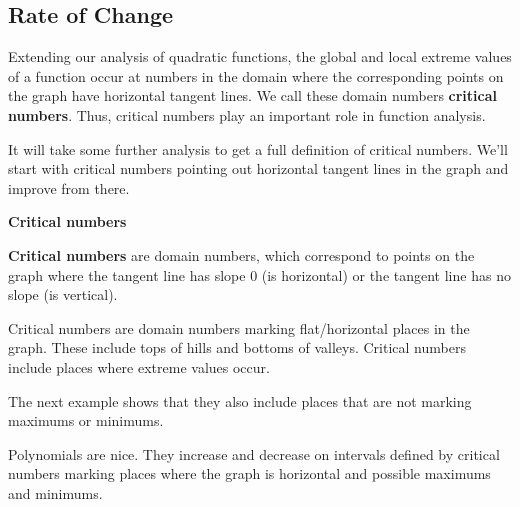\documentclass{ximera}
\begin{document}
\subsection*{Rate of Change}


Extending our analysis of quadratic functions, the global and local extreme values of a function occur at numbers in the domain where the corresponding points on the graph have horizontal tangent lines. We call these domain numbers \textbf{critical numbers}.  Thus, critical numbers play an important role in function analysis.  


It will take some further analysis to get a full definition of critical numbers. We'll start with critical numbers pointing out horizontal tangent lines in the graph and improve from there.









\begin{definition} \item \textbf{\textcolor{green!50!black}{Critical numbers}}

\textbf{Critical numbers} are domain numbers, which correspond to points on the graph where the tangent line has slope $0$ (is horizontal) or the tangent line has no slope (is vertical).

\end{definition}




Critical numbers are domain numbers marking flat/horizontal places in the graph.  These include tops of hills and bottoms of valleys. Critical numbers include places where extreme values occur.


The next example shows that they also include places that are not marking maximums or minimums.


















Polynomials are nice.  They increase and decrease on intervals defined by critical numbers marking places where the graph is horizontal and possible maximums and minimums.
\end{document}
